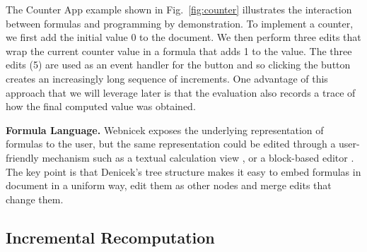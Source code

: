 \documentclass[sigconf]{acmart}
\newcommand{\note}[1]{}
\DeclareRobustCommand{\keyideabox}[3]
{\vspace{\dimexpr\baselineskip\relax} \colorbox{gray!20}{
\parbox{\dimexpr\columnwidth-\marginparsep-10pt\relax}
{\small {#1} \textbf{#2.} #3}
}}
\begin{document}
%

The Counter App example shown in Fig.~\ref{fig:counter} illustrates the interaction between formulas
and programming by demonstration. To implement a counter, we first add the initial value 0 to the
document. We then perform three edits that wrap the current counter value in a formula that adds
1 to the value. The three edits (5) are used as an event handler for the button and so clicking the
button creates an increasingly long sequence of increments. One advantage of this approach that
we will leverage later is that the evaluation also records a trace of how the final computed value
was obtained.


\keyideabox{\faSuperscript}{Formula Language}{
Webnicek exposes the underlying representation of formulas to the user, but the same representation
could be edited through a user-friendly mechanism such as a textual calculation view \cite{sarkar-2018-calc},
or a block-based editor \cite{jansen-2019-xlblocks}. The key point
is that Denicek's tree structure makes it easy to embed formulas in document in a uniform
way, edit them as other nodes and merge edits that change them.}


\subsection{Incremental Recomputation}
\label{sec:impl-incremental}
\end{document}
